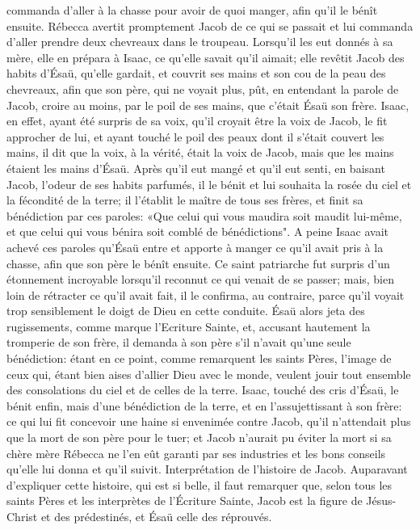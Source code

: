 commanda d'aller à la chasse pour avoir de quoi manger, afin qu'il le bénît ensuite. Rébecca avertit promptement
Jacob de ce qui se passait et lui commanda d'aller prendre deux chevreaux dans le troupeau. Lorsqu'il les eut
donnés à sa mère, elle en prépara à Isaac, ce qu'elle savait qu'il aimait; elle revêtit Jacob des habits d'Ésaü,
qu'elle gardait, et couvrit ses mains et son cou de la peau des chevreaux, afin que son père, qui ne voyait plus,
pût, en entendant la parole de Jacob, croire au moins, par le poil de ses mains, que c'était Ésaü son frère. Isaac,
en effet, ayant été surpris de sa voix, qu'il croyait être la voix de Jacob, le fit approcher de lui, et ayant touché le
poil des peaux dont il s'était couvert les mains, il dit que la voix, à la vérité, était la voix de Jacob, mais que les
mains étaient les mains d'Ésaü. Après qu'il eut mangé et qu'il eut senti, en baisant Jacob, l'odeur de ses habits
parfumés, il le bénit et lui souhaita la rosée du ciel et la fécondité de la terre; il l'établit le maître de tous ses frères,
et finit sa bénédiction par ces paroles: «Que celui qui vous maudira soit maudit lui-même, et que celui qui vous
bénira soit comblé de bénédictions".
A peine Isaac avait achevé ces paroles qu'Ésaü entre et apporte à manger ce qu'il avait pris à la chasse, afin que
son père le bénît ensuite. Ce saint patriarche fut surpris d'un étonnement incroyable lorsqu'il reconnut ce qui venait
de se passer; mais, bien loin de rétracter ce qu'il avait fait, il le confirma, au contraire, parce qu'il voyait trop
sensiblement le doigt de Dieu en cette conduite. Ésaü alors jeta des rugissements, comme marque l'Ecriture
Sainte, et, accusant hautement la tromperie de son frère, il demanda à son père s'il n'avait qu'une seule
bénédiction: étant en ce point, comme remarquent les saints Pères, l'image de ceux qui, étant bien aises d'allier
Dieu avec le monde, veulent jouir tout ensemble des consolations du ciel et de celles de la terre. Isaac, touché des
cris d'Ésaü, le bénit enfin, mais d'une bénédiction de la terre, et en l'assujettissant à son frère: ce qui lui fit
concevoir une haine si envenimée contre Jacob, qu'il n'attendait plus que la mort de son père pour le tuer; et Jacob
n'aurait pu éviter la mort si sa chère mère Rébecca ne l'en eût garanti par ses industries et les bons conseils
qu'elle lui donna et qu'il suivit.
Interprétation de l'histoire de Jacob.
 Auparavant d'expliquer cette histoire, qui est si belle, il faut remarquer que, selon tous les saints Pères et les
interprètes de l'Écriture Sainte, Jacob est la figure de Jésus-Christ et des prédestinés, et Ésaü celle des réprouvés.
